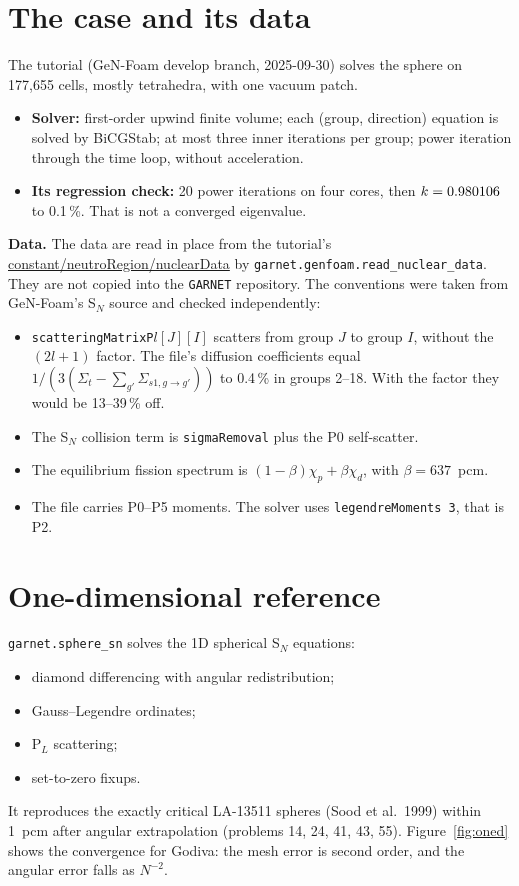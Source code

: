 \documentclass[a4paper,10pt]{article}
\newcommand{\garnet}{\texttt{GARNET}}
\newcommand{\genfoam}{GeN-Foam}
\newcommand{\code}[1]{\texttt{#1}}
\begin{document}
\section{The case and its data}

The tutorial (\genfoam{} develop branch, 2025-09-30) solves the sphere on
177,655 cells, mostly tetrahedra, with one vacuum patch.
\begin{itemize}
\item \textbf{Solver:} first-order upwind finite volume; each (group,
  direction) equation is solved by BiCGStab; at most three inner iterations per
  group; power iteration through the time loop, without acceleration.
\item \textbf{Its regression check:} 20 power iterations on four cores, then
  $k = 0.980106$ to 0.1\,\%. That is not a converged eigenvalue.
\end{itemize}

\textbf{Data.} The data are read in place from the tutorial's
\url{constant/neutroRegion/nuclearData} by
\code{garnet.genfoam.read\_nuclear\_data}. They are
not copied into the \garnet{} repository. The conventions were taken from
\genfoam's S$_N$ source and checked independently:
\begin{itemize}
\item \code{scatteringMatrixP$l$}$[J][I]$ scatters from group $J$ to group $I$,
  without the $(2l+1)$ factor. The file's diffusion coefficients equal
  $1/(3(\Sigma_t - \sum_{g'} \Sigma_{s1,g\to g'}))$ to 0.4\,\% in groups 2--18.
  With the factor they would be 13--39\,\% off.
\item The S$_N$ collision term is \code{sigmaRemoval} plus the P0 self-scatter.
\item The equilibrium fission spectrum is $(1-\beta)\chi_p + \beta\chi_d$, with
  $\beta = 637$~pcm.
\item The file carries P0--P5 moments. The solver uses \code{legendreMoments 3},
  that is P2.
\end{itemize}

\section{One-dimensional reference}

\code{garnet.sphere\_sn} solves the 1D spherical S$_N$ equations:
\begin{itemize}
\item diamond differencing with angular redistribution;
\item Gauss--Legendre ordinates;
\item P$_L$ scattering;
\item set-to-zero fixups.
\end{itemize}
It reproduces the exactly critical LA-13511 spheres (Sood et al.\ 1999) within
1~pcm after angular extrapolation (problems 14, 24, 41, 43, 55). Figure~\ref{fig:oned}
shows the convergence for Godiva: the mesh error is second order, and the angular
error falls as $N^{-2}$.
\end{document}
